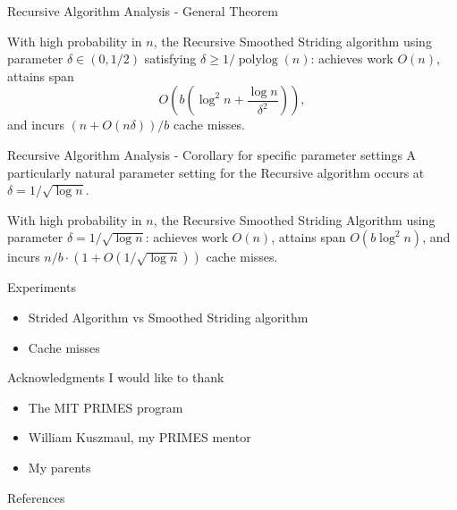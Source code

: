 \documentclass[x11names, svgnames, rgb]{beamer}
\newcommand{\polylog}{\operatorname{polylog}}
\begin{document}
\begin{frame}[t]{Recursive Algorithm Analysis - General Theorem}
	\begin{theorem}
	With high probability in $n$, the Recursive Smoothed Striding
        algorithm using parameter $\delta \in(0,1/2)$ satisfying
        $\delta \ge 1 / \polylog(n)$: achieves work $O(n)$, attains span
	$$O\left(b\left(\log^2 n + \frac{\log n}{\delta^2}\right)\right),$$
	and incurs $(n+O(n \delta))/b$ cache misses. 
	\end{theorem}
\end{frame}

\begin{frame}[t]{Recursive Algorithm Analysis - Corollary for specific parameter settings}
A particularly natural parameter setting for the Recursive algorithm occurs at $\delta = 1 / \sqrt{\log n}$.
\begin{corollary}
	With high probability in $n$, the Recursive Smoothed Striding Algorithm using parameter $\delta=1/\sqrt{\log n}$:
  achieves work $O(n)$, attains span $O(b\log^2 n)$, and incurs $n/b \cdot (1 + O(1 / \sqrt{\log n}))$ cache misses. 
\end{corollary}
\end{frame}

\begin{frame}[t]{Experiments}
	\begin{itemize}
		\item Strided Algorithm vs Smoothed Striding algorithm
		\item Cache misses 
	\end{itemize}
\end{frame}

\begin{frame}[t]{Acknowledgments}
I would like to thank
\begin{itemize}
	\item {The MIT PRIMES program}
	\item {William Kuszmaul, my PRIMES mentor}
	\item {My parents}
\end{itemize}
\end{frame}

\begin{frame}[t]{References}
	 
	
\end{frame}
\end{document}
